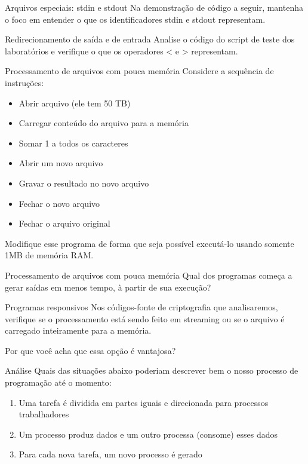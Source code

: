 \documentclass{beamer}
\begin{document}
\begin{frame}[fragile]{Arquivos especiais: stdin e stdout}
  \centering
  \large
  Na demonstração de código a seguir, mantenha o foco em entender o que
  os identificadores stdin e stdout representam.
\end{frame}

\begin{frame}[fragile]{Redirecionamento de saída e de entrada}
  \centering
  \Large
  Analise o código do script de teste dos laboratórios e verifique o que os
  operadores < e > representam.
\end{frame}

\begin{frame}[fragile]{Processamento de arquivos com pouca memória}
  \centering
  \large
  Considere a sequência de instruções:
  \begin{itemize}
    \item Abrir arquivo (ele tem 50 TB)
    \item Carregar conteúdo do arquivo para a memória
    \item Somar 1 a todos os caracteres
    \item Abrir um novo arquivo
    \item Gravar o resultado no novo arquivo
    \item Fechar o novo arquivo
    \item Fechar o arquivo original
  \end{itemize}
  Modifique esse programa de forma que seja possível executá-lo usando somente
  1MB de memória RAM.
\end{frame}

\begin{frame}[fragile]{Processamento de arquivos com pouca memória}
  \centering
  \Large
  Qual dos programas começa a gerar saídas em menos tempo, à partir de sua
  execução?
\end{frame}

\begin{frame}[fragile]{Programas responsivos}
  \centering
  \Large
  Nos códigos-fonte de criptografia que analisaremos,
  verifique se o processamento está sendo
  feito em streaming ou se o arquivo é carregado inteiramente para a memória.

  Por que você acha que essa opção é vantajosa?
\end{frame}

\begin{frame}[fragile]{Análise}
  \centering
  \large
  Quais das situações abaixo poderiam descrever bem o nosso processo de
  programação até o momento:
  \begin{enumerate}
    \item Uma tarefa é dividida em partes iguais e direcionada para
      processos trabalhadores
    \item Um processo produz dados e um outro processa (consome) esses dados
    \item Para cada nova tarefa, um novo processo é gerado
  \end{enumerate}
\end{frame}
\end{document}
